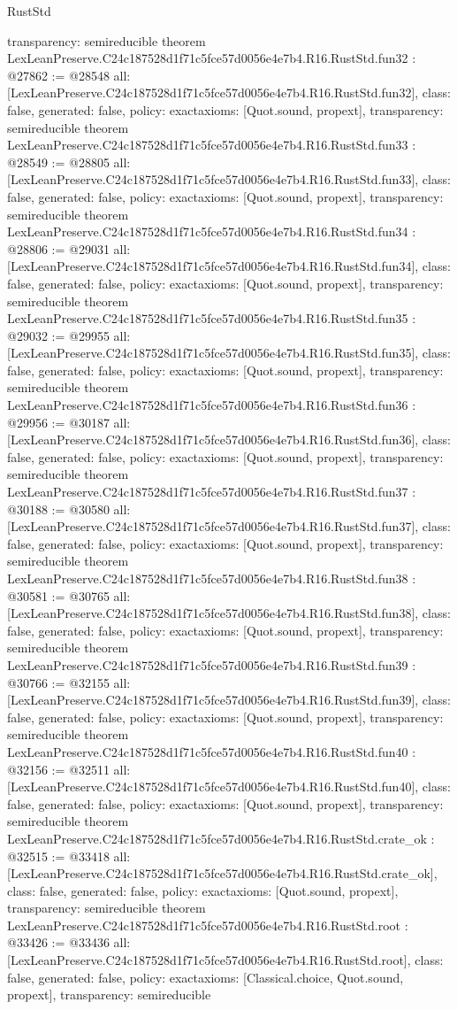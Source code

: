 \begin{lexlean}{RustStd}
\begin{coremodule}
{  transparency: semireducible
}
theorem LexLeanPreserve.C24c187528d1f71c5fce57d0056e4e7b4.R16.RustStd.fun32 : @27862 := @28548 {
  all: [LexLeanPreserve.C24c187528d1f71c5fce57d0056e4e7b4.R16.RustStd.fun32],
  class: false,
  generated: false,
  policy: exact{axioms: [Quot.sound, propext]},
  transparency: semireducible
}
theorem LexLeanPreserve.C24c187528d1f71c5fce57d0056e4e7b4.R16.RustStd.fun33 : @28549 := @28805 {
  all: [LexLeanPreserve.C24c187528d1f71c5fce57d0056e4e7b4.R16.RustStd.fun33],
  class: false,
  generated: false,
  policy: exact{axioms: [Quot.sound, propext]},
  transparency: semireducible
}
theorem LexLeanPreserve.C24c187528d1f71c5fce57d0056e4e7b4.R16.RustStd.fun34 : @28806 := @29031 {
  all: [LexLeanPreserve.C24c187528d1f71c5fce57d0056e4e7b4.R16.RustStd.fun34],
  class: false,
  generated: false,
  policy: exact{axioms: [Quot.sound, propext]},
  transparency: semireducible
}
theorem LexLeanPreserve.C24c187528d1f71c5fce57d0056e4e7b4.R16.RustStd.fun35 : @29032 := @29955 {
  all: [LexLeanPreserve.C24c187528d1f71c5fce57d0056e4e7b4.R16.RustStd.fun35],
  class: false,
  generated: false,
  policy: exact{axioms: [Quot.sound, propext]},
  transparency: semireducible
}
theorem LexLeanPreserve.C24c187528d1f71c5fce57d0056e4e7b4.R16.RustStd.fun36 : @29956 := @30187 {
  all: [LexLeanPreserve.C24c187528d1f71c5fce57d0056e4e7b4.R16.RustStd.fun36],
  class: false,
  generated: false,
  policy: exact{axioms: [Quot.sound, propext]},
  transparency: semireducible
}
theorem LexLeanPreserve.C24c187528d1f71c5fce57d0056e4e7b4.R16.RustStd.fun37 : @30188 := @30580 {
  all: [LexLeanPreserve.C24c187528d1f71c5fce57d0056e4e7b4.R16.RustStd.fun37],
  class: false,
  generated: false,
  policy: exact{axioms: [Quot.sound, propext]},
  transparency: semireducible
}
theorem LexLeanPreserve.C24c187528d1f71c5fce57d0056e4e7b4.R16.RustStd.fun38 : @30581 := @30765 {
  all: [LexLeanPreserve.C24c187528d1f71c5fce57d0056e4e7b4.R16.RustStd.fun38],
  class: false,
  generated: false,
  policy: exact{axioms: [Quot.sound, propext]},
  transparency: semireducible
}
theorem LexLeanPreserve.C24c187528d1f71c5fce57d0056e4e7b4.R16.RustStd.fun39 : @30766 := @32155 {
  all: [LexLeanPreserve.C24c187528d1f71c5fce57d0056e4e7b4.R16.RustStd.fun39],
  class: false,
  generated: false,
  policy: exact{axioms: [Quot.sound, propext]},
  transparency: semireducible
}
theorem LexLeanPreserve.C24c187528d1f71c5fce57d0056e4e7b4.R16.RustStd.fun40 : @32156 := @32511 {
  all: [LexLeanPreserve.C24c187528d1f71c5fce57d0056e4e7b4.R16.RustStd.fun40],
  class: false,
  generated: false,
  policy: exact{axioms: [Quot.sound, propext]},
  transparency: semireducible
}
theorem LexLeanPreserve.C24c187528d1f71c5fce57d0056e4e7b4.R16.RustStd.crate_ok : @32515 := @33418 {
  all: [LexLeanPreserve.C24c187528d1f71c5fce57d0056e4e7b4.R16.RustStd.crate_ok],
  class: false,
  generated: false,
  policy: exact{axioms: [Quot.sound, propext]},
  transparency: semireducible
}
theorem LexLeanPreserve.C24c187528d1f71c5fce57d0056e4e7b4.R16.RustStd.root : @33426 := @33436 {
  all: [LexLeanPreserve.C24c187528d1f71c5fce57d0056e4e7b4.R16.RustStd.root],
  class: false,
  generated: false,
  policy: exact{axioms: [Classical.choice, Quot.sound, propext]},
  transparency: semireducible
}


\end{coremodule}
\end{lexlean}

